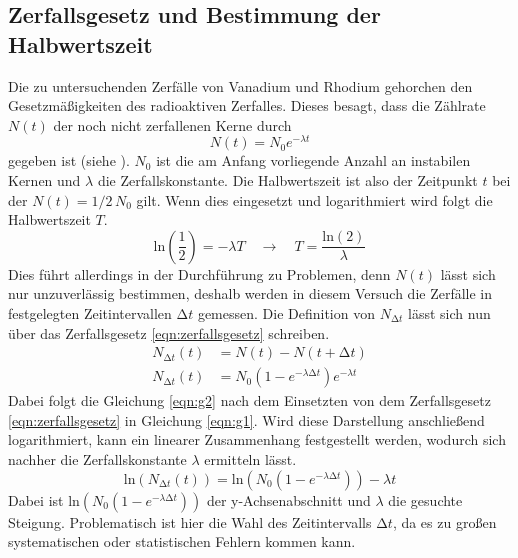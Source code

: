 \subsection{Zerfallsgesetz und Bestimmung der Halbwertszeit}
Die zu untersuchenden Zerfälle von Vanadium und Rhodium gehorchen den Gesetzmäßigkeiten des radioaktiven Zerfalles. Dieses besagt, dass die Zählrate $N(t)$ der noch nicht zerfallenen Kerne durch
\begin{equation}
\label{eqn:zerfallsgesetz}
N(t) = N_{0} e^{-\lambda t}
\end{equation}
gegeben ist (siehe \cite{skript2}). $N_{0}$ ist die am Anfang vorliegende Anzahl an instabilen Kernen und $\lambda$ die Zerfallskonstante.
Die Halbwertszeit ist also der Zeitpunkt $t$ bei der $N(t) = 1/2 \, N_{0}$ gilt.
Wenn dies eingesetzt und logarithmiert wird folgt die Halbwertszeit $T$.
\begin{equation}
\text{ln}\left( \frac{1}{2}\right) = -\lambda T \quad \to \quad T = \frac{\text{ln}(2)}{\lambda}
\end{equation}
Dies führt allerdings in der Durchführung zu Problemen, denn $N(t)$ lässt sich nur unzuverlässig bestimmen, deshalb werden in diesem Versuch die Zerfälle in
festgelegten Zeitintervallen $\increment t$ gemessen.
Die Definition von $N_{\increment t}$ lässt sich nun über das Zerfallsgesetz \eqref{eqn:zerfallsgesetz} schreiben.
\begin{align}
\label{eqn:g1}
N_{\increment t}(t) &=  N(t) - N(t + \increment t) \\
\label{eqn:g2}
N_{\increment t}(t) &= N_{0} (1-e^{-\lambda \increment t}) e^{-\lambda t}
\end{align}
Dabei folgt die Gleichung \eqref{eqn:g2} nach dem Einsetzten von dem Zerfallsgesetz \eqref{eqn:zerfallsgesetz} in Gleichung \eqref{eqn:g1}.
Wird diese Darstellung anschließend logarithmiert, kann ein linearer Zusammenhang festgestellt werden, wodurch sich nachher die Zerfallskonstante $\lambda$ ermitteln lässt.
\begin{equation}
\text{ln}(N_{\increment t}(t)) = \text{ln}(N_{0}(1-e^{-\lambda \increment t})) - \lambda t
\end{equation}
Dabei ist $\text{ln}(N_{0}(1-e^{-\lambda \increment t}))$ der y-Achsenabschnitt und $\lambda$ die gesuchte Steigung.
Problematisch ist hier die Wahl des Zeitintervalls $\increment t$, da es zu großen systematischen oder statistischen Fehlern kommen kann.

